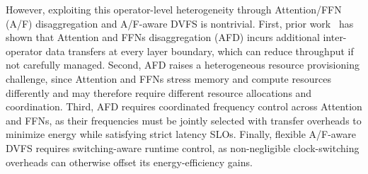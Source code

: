 However, exploiting this operator-level heterogeneity through Attention/FFN (A/F) disaggregation and A/F-aware DVFS is nontrivial.
%
First, prior work~\cite{XX} has shown that Attention and FFNs disaggregation (AFD) incurs additional inter-operator data transfers at every layer boundary, which can reduce throughput if not carefully managed.
%
Second, AFD raises a heterogeneous resource provisioning challenge, since Attention and FFNs stress memory and compute resources differently and may therefore require different resource allocations and coordination.
%
Third, AFD requires coordinated frequency control across Attention and FFNs, as their frequencies must be jointly selected with transfer overheads to minimize energy while satisfying strict latency SLOs.
%
Finally, flexible A/F-aware DVFS requires switching-aware runtime control, as non-negligible clock-switching overheads can otherwise offset its energy-efficiency gains.




